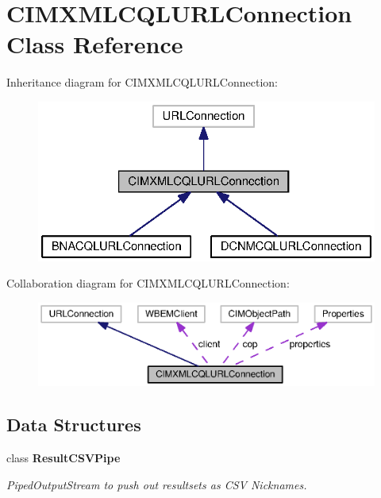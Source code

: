\section{C\+I\+M\+X\+M\+L\+C\+Q\+L\+U\+R\+L\+Connection Class Reference}
\label{classorg_1_1smallfoot_1_1parser_1_1cimcql_1_1CIMXMLCQLURLConnection}


Inheritance diagram for C\+I\+M\+X\+M\+L\+C\+Q\+L\+U\+R\+L\+Connection\+:\nopagebreak
\begin{figure}[H]
\begin{center}
\leavevmode
\includegraphics[width=325pt]{classorg_1_1smallfoot_1_1parser_1_1cimcql_1_1CIMXMLCQLURLConnection__inherit__graph}
\end{center}
\end{figure}


Collaboration diagram for C\+I\+M\+X\+M\+L\+C\+Q\+L\+U\+R\+L\+Connection\+:\nopagebreak
\begin{figure}[H]
\begin{center}
\leavevmode
\includegraphics[width=350pt]{classorg_1_1smallfoot_1_1parser_1_1cimcql_1_1CIMXMLCQLURLConnection__coll__graph}
\end{center}
\end{figure}
\subsection*{Data Structures}
\begin{DoxyCompactItemize}
\item 
class {\bf Result\+C\+S\+V\+Pipe}
\begin{DoxyCompactList}\small\item\em Piped\+Output\+Stream to push out resultsets as C\+S\+V Nicknames. \end{DoxyCompactList}\end{DoxyCompactItemize}
